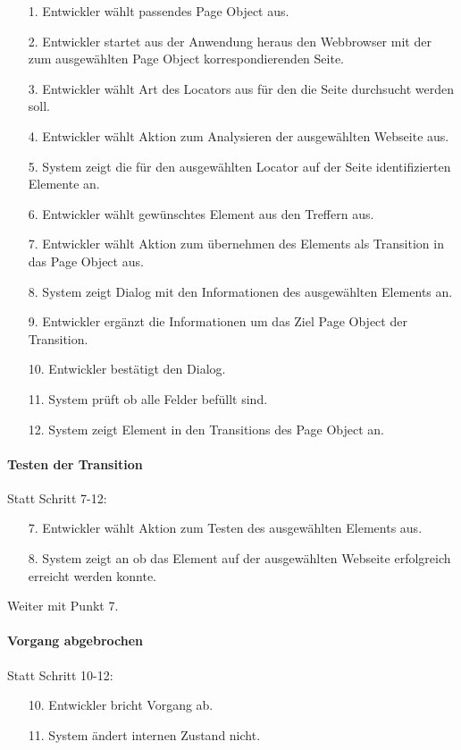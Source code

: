 \begin{itemize}[itemsep=0pt]
\item[1.] Entwickler wählt passendes Page Object aus.
\item[2.] Entwickler startet aus der Anwendung heraus den Webbrowser mit der zum ausgewählten Page Object korrespondierenden Seite. 
\item[3.] Entwickler wählt Art des Locators aus für den die Seite durchsucht werden soll.
\item[4.] Entwickler wählt Aktion zum Analysieren der ausgewählten Webseite aus.
\item[5.] System zeigt die für den ausgewählten Locator auf der Seite identifizierten Elemente an.
\item[6.] Entwickler wählt gewünschtes Element aus den Treffern aus. 
\item[7.] Entwickler wählt Aktion zum übernehmen des Elements als Transition in das Page Object aus.
\item[8.] System zeigt Dialog mit den Informationen des ausgewählten Elements an.
\item[9.] Entwickler ergänzt die Informationen um das Ziel Page Object der Transition.
\item[10.] Entwickler bestätigt den Dialog.
\item[11.] System prüft ob alle Felder befüllt sind.
\item[12.] System zeigt Element in den Transitions des Page Object an.
\end{itemize}

\paragraph{Testen der Transition}
Statt Schritt 7-12:
\begin{itemize}
\item[7.] Entwickler wählt Aktion zum Testen des ausgewählten Elements aus. 
\item[8.] System zeigt an ob das Element auf der ausgewählten Webseite erfolgreich erreicht werden konnte. 
\end{itemize}
Weiter mit Punkt 7.

\paragraph{Vorgang abgebrochen}
Statt Schritt 10-12:
\begin{itemize}[itemsep=0pt]
\item[10.] Entwickler bricht Vorgang ab. 
\item[11.] System ändert internen Zustand nicht. 
\end{itemize}

